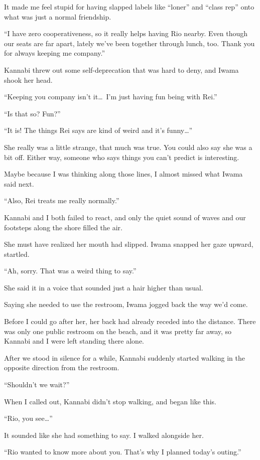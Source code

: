 \documentclass[
    a4paper,
    12pt,
    twoside,
    openany,
    UTF8,
    fontset=windows
]{ctexbook}
\begin{document}
It made me feel stupid for having slapped labels like ``loner'' and ``class rep'' onto what was just a normal friendship.

``I have zero cooperativeness, so it really helps having Rio nearby. Even though our seats are far apart, lately we've been together through lunch, too. Thank you for always keeping me company.''

Kannabi threw out some self-deprecation that was hard to deny, and Iwama shook her head.

``Keeping you company isn't it\dots\ I'm just having fun being with Rei.''

``Is that so? Fun?''

``It is! The things Rei says are kind of weird and it's funny\dots''

She really was a little strange, that much was true. You could also say she was a bit off. Either way, someone who says things you can't predict is interesting.

Maybe because I was thinking along those lines, I almost missed what Iwama said next.

``Also, Rei treats me really normally.''

Kannabi and I both failed to react, and only the quiet sound of waves and our footsteps along the shore filled the air.

She must have realized her mouth had slipped. Iwama snapped her gaze upward, startled.

``Ah, sorry. That was a weird thing to say.''

She said it in a voice that sounded just a hair higher than usual.

Saying she needed to use the restroom, Iwama jogged back the way we'd come.

Before I could go after her, her back had already receded into the distance. There was only one public restroom on the beach, and it was pretty far away, so Kannabi and I were left standing there alone.

After we stood in silence for a while, Kannabi suddenly started walking in the opposite direction from the restroom.

``Shouldn't we wait?''

When I called out, Kannabi didn't stop walking, and began like this.

``Rio, you see\dots''

It sounded like she had something to say. I walked alongside her.

``Rio wanted to know more about you. That's why I planned today's outing.''
\end{document}
